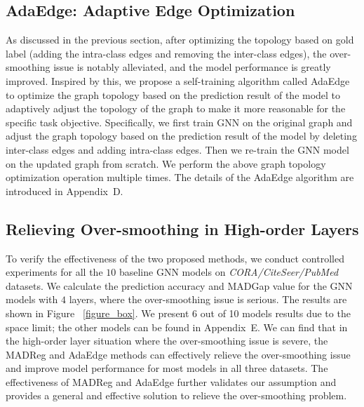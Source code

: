 \documentclass[letterpaper]{article} \usepackage{aaai20}  \usepackage{times}  \usepackage{helvet} \usepackage{courier}  \usepackage[hyphens]{url}  \usepackage{graphicx} \urlstyle{rm} \def\UrlFont{\rm}  \frenchspacing  \setlength{\pdfpagewidth}{8.5in}  \setlength{\pdfpageheight}{11in}  \setcounter{secnumdepth}{0}
\begin{document}
\subsection{AdaEdge: Adaptive Edge Optimization}
As discussed in the previous section, after optimizing the topology based on gold label (adding the intra-class edges and removing the inter-class edges), the over-smoothing issue is notably alleviated, and the model performance is greatly improved. Inspired by this, we propose a self-training algorithm called AdaEdge to optimize the graph topology based on the prediction result of the model to adaptively adjust the topology of the graph to make it more reasonable for the specific task objective. Specifically, we first train GNN on the original graph and adjust the graph topology based on the prediction result of the model by deleting inter-class edges and adding intra-class edges. Then we re-train the GNN model on the updated graph from scratch. We perform the above graph topology optimization operation multiple times. 
The details of the AdaEdge algorithm are introduced in Appendix~D. 

\subsection{Relieving Over-smoothing in High-order Layers}

To verify the effectiveness of the two proposed methods, we conduct controlled experiments for all the $10$ baseline GNN models on \textit{CORA/CiteSeer/PubMed} datasets. We calculate the prediction accuracy and MADGap value for the GNN models with $4$ layers, where the over-smoothing issue is serious. The results are shown in Figure~ \ref{figure_box}. We present 6 out of 10 models results due to the space limit; the other models can be found in Appendix~E.
We can find that in the high-order layer situation where the over-smoothing issue is severe, the MADReg and AdaEdge methods can effectively relieve the over-smoothing issue and improve model performance for most models in all three datasets.
The effectiveness of MADReg and AdaEdge further validates our assumption and provides a general and effective solution to relieve the over-smoothing problem.
\end{document}
